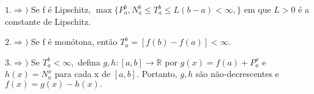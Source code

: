 \documentclass[Analysis/analysis_notes.tex]{subfiles}
\begin{document}
\begin{proof*}
	\(1. \Rightarrow )\) Se f é Lipschitz, \(\max\{P_{a}^{b}, N_{a}^{b}\leq T_{a}^{b}\leq L(b-a) < \infty,\}\)
	em que \(L > 0\) é a constante de Lipschitz.

	\(2. \Rightarrow )\) Se f é monótona, então \(T_{a}^{b} = [f(b)-f(a)] < \infty.\)

	\(3. \Rightarrow )\) Se \(T_{a}^{b} < \infty,\) defina \(g, h:[a, b]\rightarrow \mathbb{R}\) por
	\(g(x) = f(a) + P_{a}^{x}\) e \(h(x) = N_{a}^{x}\) para cada x de \([a, b]\). Portanto,
	\(g, h\) são não-decrescentes e \(f(x) = g(x) - h(x).\) \qedsymbol
\end{proof*}
\end{document}

